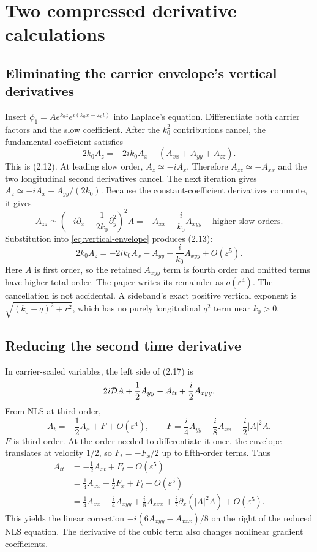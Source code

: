 \section{Two compressed derivative calculations}
\label{sec:details}
\subsection{Eliminating the carrier envelope's vertical derivatives}
Insert $\phi_1=Ae^{k_0z}e^{i(k_0x-\omega_0t)}$ into Laplace's equation.
Differentiate both carrier factors and the slow coefficient. After the
$k_0^2$ contributions cancel, the fundamental coefficient satisfies
\begin{equation}\label{eq:vertical-envelope}
 2k_0A_z=-2ik_0A_x-(A_{xx}+A_{yy}+A_{zz}).
\end{equation}
This is (2.12). At leading slow order, $A_z\simeq-iA_x$. Therefore
$A_{zz}\simeq-A_{xx}$ and the two longitudinal second derivatives cancel.
The next iteration gives $A_z\simeq-iA_x-A_{yy}/(2k_0)$.
Because the constant-coefficient derivatives commute, it gives
\[
 A_{zz}\simeq
 \left(-i\partial_x-\frac1{2k_0}\partial_y^2\right)^2A
 =-A_{xx}+\frac i{k_0}A_{xyy}+\text{higher slow orders}.
\]
Substitution into \eqref{eq:vertical-envelope} produces (2.13):
\begin{equation}\label{eq:vertical-reduced}
 2k_0A_z=-2ik_0A_x-A_{yy}-\frac i{k_0}A_{xyy}
        +O(\varepsilon^5).
\end{equation}
Here $A$ is first order, so the retained $A_{xyy}$ term is fourth order
and omitted terms have higher total order. The paper writes its
remainder as $o(\varepsilon^4)$. The cancellation is not accidental.
A sideband's exact positive vertical exponent is
$\sqrt{(k_0+q)^2+r^2}$, which has no purely longitudinal $q^2$ term
near $k_0>0$.

\subsection{Reducing the second time derivative}
\label{sec:reduction}
In carrier-scaled variables, the left side of (2.17) is
\[
 2i\mathcal{D} A+\frac12A_{yy}-A_{tt}+\frac i2A_{xyy}.
\]
From NLS at third order,
\begin{equation}\label{eq:order-reduction-F}
 A_t=-\frac12A_x+F+O(\varepsilon^4),\qquad
 F=\frac i4A_{yy}-\frac i8A_{xx}-\frac i2|A|^2A.
\end{equation}
$F$ is third order. At the order needed to differentiate it once,
the envelope translates at velocity $1/2$, so $F_t=-F_x/2$ up to
fifth-order terms. Thus
\begin{align*}
 A_{tt}&=-\frac12A_{xt}+F_t+O(\varepsilon^5)\\
 &=\frac14A_{xx}-\frac12F_x+F_t+O(\varepsilon^5)\\
 &=\frac14A_{xx}-\frac i4A_{xyy}+\frac i8A_{xxx}
   +\frac i2\partial_x(|A|^2A)+O(\varepsilon^5).
\end{align*}
This yields the linear correction
$-i(6A_{xyy}-A_{xxx})/8$ on the right of the reduced NLS equation.
The derivative of the cubic term also changes nonlinear gradient coefficients.

